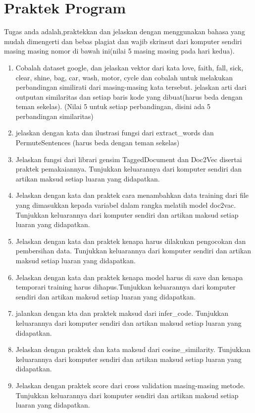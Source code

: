 \section{Praktek Program}
Tugas anda adalah,praktekkan dan jelaskan dengan menggunakan bahasa yang mudah dimengerti dan bebas plagiat dan wajib skrinsut dari komputer sendiri masing masing nomor di bawah ini(nilai 5 masing masing pada hari kedua).

\begin{enumerate}
\item Cobalah dataset google, dan jelaskan vektor dari kata love, faith, fall, sick, clear, shine, bag, car, wash, motor, cycle dan cobalah untuk melakukan perbandingan similirati dari masing-masing kata tersebut. jelaskan arti dari outputan similaritas dan setiap baris kode yang dibuat(harus beda dengan teman sekelas). (Nilai 5 untuk setiap perbandingan, disini ada 5 perbandingan similaritas)

\item jelaskan dengan kata dan ilustrasi fungsi dari extract\_words dan PermuteSentences (harus beda dengan teman sekelas)

\item Jelaskan fungsi dari librari gensim TaggedDocument dan Doc2Vec disertai praktek pemakaiannya. Tunjukkan keluarannya dari komputer sendiri dan artikan maksud setiap luaran yang didapatkan.

\item Jelaskan dengan kata dan praktek cara menambahkan data training dari file yang dimasukkan kepada variabel dalam rangka melatih model doc2vac. Tunjukkan keluarannya dari komputer sendiri dan artikan maksud setiap luaran yang didapatkan.

\item Jelaskan dengan kata dan praktek kenapa harus dilakukan pengocokan dan pembersihan data. Tunjukkan keluarannya dari komputer sendiri dan artikan maksud setiap luaran yang didapatkan.

\item Jelaskan dengan kata dan praktek kenapa model harus di save dan kenapa temporari training harus dihapus.Tunjukkan keluarannya dari komputer sendiri dan artikan maksud setiap luaran yang didapatkan.

\item jalankan dengan kta dan praktek maksud dari infer\_code. Tunjukkan keluarannya dari komputer sendiri dan artikan maksud setiap luaran yang didapatkan.

\item Jelaskan dengan praktek dan kata maksud dari cosine\_similarity. Tunjukkan keluarannya dari komputer sendiri dan artikan maksud setiap luaran yang didapatkan.

\item Jelaskan dengan praktek score dari cross validation masing-masing metode. Tunjukkan keluarannya dari komputer sendiri dan artikan maksud setiap luaran yang didapatkan.

\end{enumerate}


